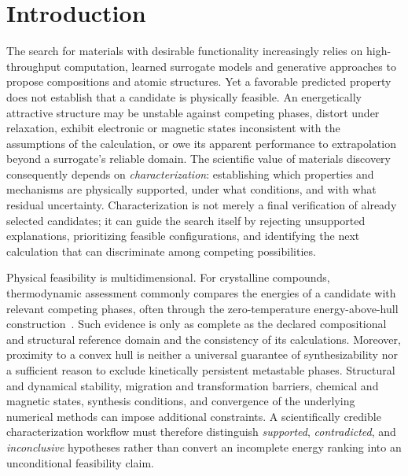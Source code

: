 \documentclass[11pt,a4paper]{article}
\begin{document}
\section{Introduction}
\label{sec:intro}
The search for materials with desirable functionality increasingly relies on high-throughput computation, learned surrogate models and generative approaches to propose compositions and atomic structures. Yet a favorable predicted property does not establish that a candidate is physically feasible. An energetically attractive structure may be unstable against competing phases, distort under relaxation, exhibit electronic or magnetic states inconsistent with the assumptions of the calculation, or owe its apparent performance to extrapolation beyond a surrogate's reliable domain. The scientific value of materials discovery consequently depends on \emph{characterization}: establishing which properties and mechanisms are physically supported, under what conditions, and with what residual uncertainty. Characterization is not merely a final verification of already selected candidates; it can guide the search itself by rejecting unsupported explanations, prioritizing feasible configurations, and identifying the next calculation that can discriminate among competing possibilities.

Physical feasibility is multidimensional. For crystalline compounds, thermodynamic assessment commonly compares the energies of a candidate with relevant competing phases, often through the zero-temperature energy-above-hull construction~\cite{ong2013pymatgen,sun2016metastability}. Such evidence is only as complete as the declared compositional and structural reference domain and the consistency of its calculations. Moreover, proximity to a convex hull is neither a universal guarantee of synthesizability nor a sufficient reason to exclude kinetically persistent metastable phases. Structural and dynamical stability, migration and transformation barriers, chemical and magnetic states, synthesis conditions, and convergence of the underlying numerical methods can impose additional constraints. A scientifically credible characterization workflow must therefore distinguish \emph{supported}, \emph{contradicted}, and \emph{inconclusive} hypotheses rather than convert an incomplete energy ranking into an unconditional feasibility claim.
\end{document}
